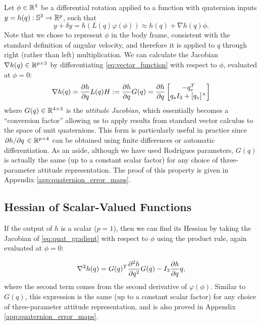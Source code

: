 \documentclass[../root.tex]{subfiles}
\begin{document}
        Let $\phi \in \mathbb{R}^3$ be a differential rotation applied to a function with
        quaternion inputs 
        $y = h(q): \mathbb{S}^3 \to \mathbb{R}^p$, such that
        \begin{equation} \label{eq:vector_function}
            y + \delta y = h(L(q) \varphi(\phi)) \approx h(q) +  \nabla h(q) \phi.
        \end{equation}
        Note that we chose to represent $\phi$ in the body frame,
        consistent with the standard definition of angular velocity, and
        therefore it is applied to $q$ through right (rather than left)
        multiplication. We can calculate the Jacobian $\nabla h(q) \in \mathbb{R}^{p
        \times 3}$ by
        differentiating \eqref{eq:vector_function} with respect to $\phi$,
        evaluated at
        $\phi = 0$:
        \begin{equation} \label{eq:quat_gradient}
            \nabla h(q) = \pdv{h}{q} L(q) H := \pdv{h}{q} G(q) 
                        = \pdv{h}{q} \begin{bmatrix} 
                            -q_v^T \\ 
                            q_s I_3 + [q_v]^\times
                        \end{bmatrix}
        \end{equation}
        where $G(q) \in \mathbb{R}^{4 \times 3}$ is the \textit{attitude Jacobian},
        which essentially becomes a ``conversion factor'' allowing us to
        apply results from standard vector calculus to the space of unit
        quaternions. This form is particularly useful in practice since
        $\pdv*{h}{q} \in \mathbb{R}^{p \times 4}$ can be obtained using finite
        differences or automatic differentiation. As an aside, although we
        have used Rodrigues parameters, $G(q)$ is actually the same (up to a
        constant scalar factor) for any choice of three-parameter attitude
        representation. The proof of this property is given in Appendix
        \ref{app:quaternion_error_maps}.

    \subsection{Hessian of Scalar-Valued Functions} \label{sec:quat_hessian}
	    If the output of $h$ is a scalar ($p = 1$), then we can find its Hessian by
	    taking the Jacobian of \eqref{eq:quat_gradient} with respect to $\phi$ using the
        product rule, again evaluated at $\phi = 0$:

	    \begin{equation} \label{eq:quat_hessian}
            \nabla^2 h(q) = G(q)^T \pdv[2]{h}{q} G(q) - I_3 \pdv{h}{q}q,
	    \end{equation}
	    where the second term comes from the second derivative of $\varphi(\phi)$.
	    Similar to $G(q)$, this expression is the same (up to a constant scalar factor) for any
        choice of three-parameter attitude representation, and is also proved in 
        Appendix \ref{app:quaternion_error_maps}.
        
\end{document}
